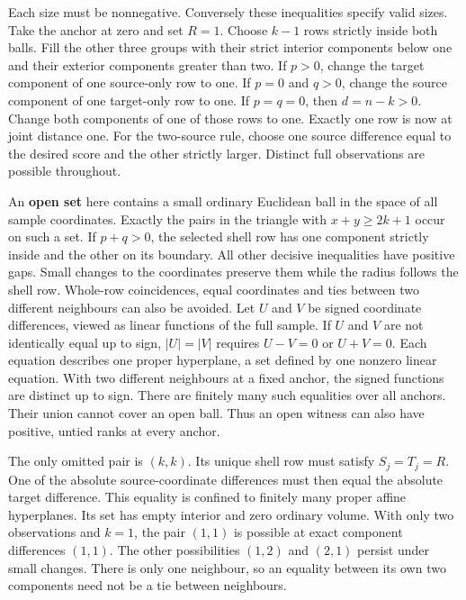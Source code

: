 Each size must be nonnegative. Conversely these inequalities specify valid sizes. Take the anchor at zero and set \(R=1\). Choose \(k-1\) rows strictly inside both balls. Fill the other three groups with their strict interior components below one and their exterior components greater than two. If \(p>0\), change the target component of one source-only row to one. If \(p=0\) and \(q>0\), change the source component of one target-only row to one. If \(p=q=0\), then \(d=n-k>0\). Change both components of one of those rows to one. Exactly one row is now at joint distance one. For the two-source rule, choose one source difference equal to the desired score and the other strictly larger. Distinct full observations are possible throughout.

\clearpage

An \textbf{open set} here contains a small ordinary Euclidean ball in the space of all sample coordinates. Exactly the pairs in the triangle with \(x+y\ge2k+1\) occur on such a set. If \(p+q>0\), the selected shell row has one component strictly inside and the other on its boundary. All other decisive inequalities have positive gaps. Small changes to the coordinates preserve them while the radius follows the shell row. Whole-row coincidences, equal coordinates and ties between two different neighbours can also be avoided. Let \(U\) and \(V\) be signed coordinate differences, viewed as linear functions of the full sample. If \(U\) and \(V\) are not identically equal up to sign, \(|U|=|V|\) requires \(U-V=0\) or \(U+V=0\). Each equation describes one proper hyperplane, a set defined by one nonzero linear equation. With two different neighbours at a fixed anchor, the signed functions are distinct up to sign. There are finitely many such equalities over all anchors. Their union cannot cover an open ball. Thus an open witness can also have positive, untied ranks at every anchor.

The only omitted pair is \((k,k)\). Its unique shell row must satisfy \(S_j=T_j=R\). One of the absolute source-coordinate differences must then equal the absolute target difference. This equality is confined to finitely many proper affine hyperplanes. Its set has empty interior and zero ordinary volume. With only two observations and \(k=1\), the pair \((1,1)\) is possible at exact component differences \((1,1)\). The other possibilities \((1,2)\) and \((2,1)\) persist under small changes. There is only one neighbour, so an equality between its own two components need not be a tie between neighbours.

